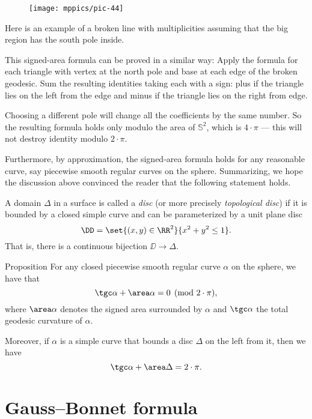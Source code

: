 \begin{wrapfigure}{o}{32 mm}
\vskip-0mm
\centering
\texttt{[image: mppics/pic-44]}
\vskip-0mm
\end{wrapfigure}

Here is an example of a broken line with multiplicities assuming that the big region has the south pole inside.

This signed-area formula can be proved in a similar way:
Apply the formula for each triangle with vertex at the north pole and base at each edge of the broken geodesic.
Sum the resulting identities taking each with a sign: plus if the triangle lies on the left from the edge and minus if the triangle lies on the right from edge.

Choosing a different pole will change all the coefficients by the same number.
So the resulting formula holds only modulo the area of $\mathbb{S}^2$, which is $4\cdot \pi$ --- this will not destroy identity modulo $2\cdot\pi$.

Furthermore, by approximation, the signed-area formula holds for any reasonable curve, say piecewise smooth regular curves on the sphere.
Summarizing, we hope the discussion above convinced the reader that the following statement holds.

A domain $\Delta$ in a surface is called a \emph{disc} (or more precisely \emph{topological disc}) if it is bounded by a closed simple curve and can be parameterized by a unit plane disc 
\[\DD=\set{(x,y)\in\RR^2}{x^2+y^2\le1}.\]
That is, there is a continuous bijection $\DD\to\Delta$.

\begin{thm}{Proposition}\label{prop:spherical-gb}
For any closed piecewise smooth regular curve $\alpha$ on the sphere, 
we have that 
\[\tgc\alpha+\area\alpha=0 \pmod{2\cdot\pi},\]
where $\area\alpha$ denotes the signed area surrounded by $\alpha$ and $\tgc\alpha$ the total geodesic curvature of $\alpha$.

Moreover, if $\alpha$ is a simple curve that bounds a disc $\Delta$ on the left from it, then we have 
\[\tgc\alpha+\area\Delta=2\cdot\pi.\]

\end{thm}





\section*{Gauss--Bonnet formula}


